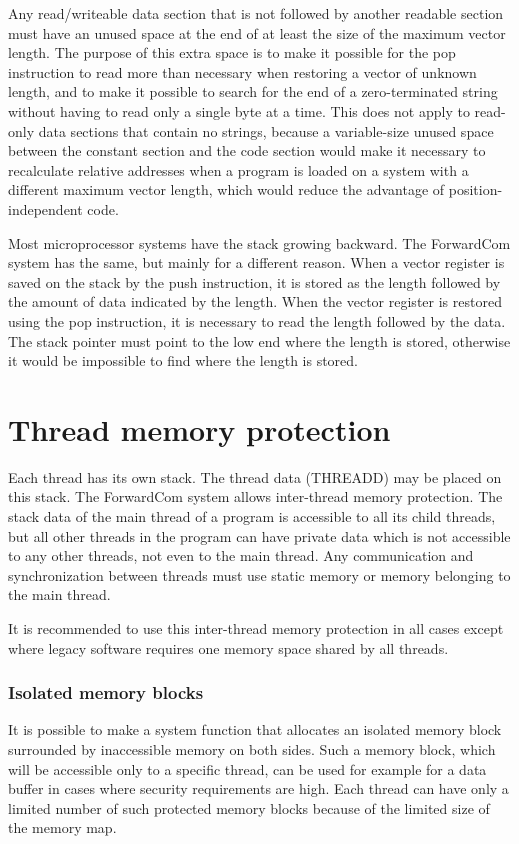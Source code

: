 \documentclass[forwardcom.tex]{subfiles}
\begin{document}
\label{extraSpaceAtEndOfData}
Any read/writeable data section that is not followed by another readable section must have an unused space at the end of at least the size of the maximum vector length. The purpose of this extra space is to make it possible for the pop instruction to read more than necessary when restoring a vector of unknown length, and to make 
it possible to search for the end of a zero-terminated string without having to read only a single byte at a time. This does not apply to read-only data sections that contain no strings, because a variable-size unused space between the constant section and the code section would make it necessary to recalculate relative addresses when a program is loaded on a system with a different maximum vector length, which would reduce the advantage of position-independent code.
\vspace{2mm}

Most microprocessor systems have the stack growing backward. The ForwardCom system has the same, but mainly for a different reason. When a vector register is saved on the stack by the push instruction, it is stored as the length followed by the amount of data indicated by the length. When the vector register is restored using the pop instruction, it is necessary to read the length followed by the data. The stack pointer must point to the low end where the length is stored, otherwise it would be impossible to find where the length is stored. 

\section{Thread memory protection} \label{threadMemoryProtection}
Each thread has its own stack. The thread data (THREADD) may be placed on this stack. The ForwardCom system allows inter-thread memory protection. The stack data of the main thread of a program is accessible to all its child threads, but all other threads in the program can have private data which is not accessible to any other threads, not even to the main thread. Any communication and synchronization between threads must use static memory or memory belonging to the main thread. 
\vspace{2mm}

It is recommended to use this inter-thread memory protection in all cases except where legacy software requires one memory space shared by all threads. 
\vspace{2mm}

\subsubsection{Isolated memory blocks} \label{isolatedMemoryBlocks}
It is possible to make a system function that allocates an isolated memory block surrounded by inaccessible memory on both sides. Such a memory block, which will be accessible only to a specific thread, can be used for example for a data buffer in cases where security requirements are high. Each thread can have only a limited number of such protected memory blocks because of the limited size of the memory map.
\end{document}
